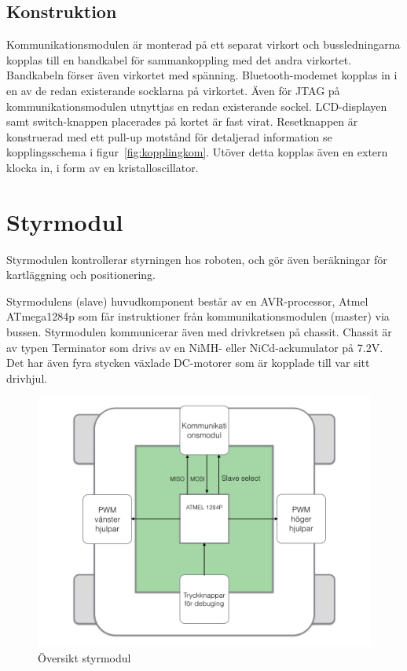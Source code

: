 \documentclass[a4paper,12pt,fleqn]{article}
\begin{document}
\subsection{Konstruktion}
Kommunikationsmodulen är monterad på ett separat virkort och bussledningarna kopplas till en bandkabel för sammankoppling med det andra virkortet.  Bandkabeln förser även virkortet med spänning.
Bluetooth-modemet kopplas in i en av de redan existerande socklarna på virkortet. Även för JTAG på kommunikationsmodulen utnyttjas en redan existerande sockel. LCD-displayen samt switch-knappen placerades på kortet är fast
virat. Resetknappen är konstruerad med ett pull-up motstånd för detaljerad information se kopplingsschema i figur~\ref{fig:kopplingkom}.
Utöver detta kopplas även en extern klocka in, i form av en kristalloscillator.


\newpage
\section{Styrmodul}
Styrmodulen kontrollerar styrningen hos roboten, och gör även beräkningar för kartläggning och positionering. 

Styrmodulens (slave) huvudkomponent består av en AVR-processor, Atmel ATmega1284p som får instruktioner från kommunikationsmodulen (master) via bussen. Styrmodulen kommunicerar även med drivkretsen på chassit. Chassit är av typen Terminator som drivs av en NiMH- eller NiCd-ackumulator på 7.2V. Det har även fyra stycken växlade DC-motorer som är kopplade till var sitt drivhjul. 

\begin{figure}[htp] %
  \begin{center}
  \includegraphics[keepaspectratio=true,width=\linewidth]{bilder/styrmodul.jpg}  %
  \end{center}
  \caption{Översikt styrmodul} %
  \label{fig:styr} %
\end{figure}
\newpage
\end{document}
